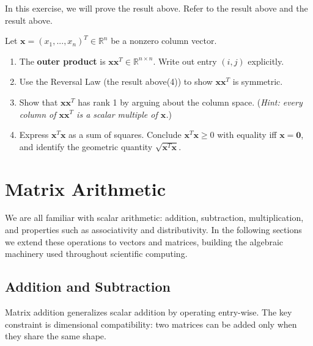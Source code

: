 \documentclass[
  letterpaper,
]{scrbook}
\newcommand{\fR}{\mathbb{R}}
\newcommand{\bx}{\boldsymbol{x}}
\newcommand{\bzero}{\mathbf{0}}
\begin{document}
\begin{tcolorbox}[enhanced jigsaw, arc=.35mm, bottomrule=.15mm, bottomtitle=1mm, breakable, colback=white, colbacktitle=quarto-callout-warning-color!10!white, colframe=quarto-callout-warning-color-frame, coltitle=black, left=2mm, leftrule=.75mm, opacityback=0, opacitybacktitle=0.6, rightrule=.15mm, title={Exercise}, titlerule=0mm, toprule=.15mm, toptitle=1mm]

In this exercise, we will prove the result above. Refer to the result
above and the result above.

Let \(\bx = (x_1, ..., x_n)^T \in \fR^n\) be a nonzero column vector.

\begin{enumerate}
\def\labelenumi{\arabic{enumi}.}
\item
  The \textbf{outer product} is \(\bx\bx^T \in \fR^{n \times n}\). Write
  out entry \((i,j)\) explicitly.
\item
  Use the Reversal Law (the result above(4)) to show \(\bx\bx^T\) is
  symmetric.
\item
  Show that \(\bx\bx^T\) has rank 1 by arguing about the column space.
  (\emph{Hint: every column of \(\bx\bx^T\) is a scalar multiple of
  \(\bx\).})
\item
  Express \(\bx^T\bx\) as a sum of squares. Conclude \(\bx^T\bx \ge 0\)
  with equality iff \(\bx = \bzero\), and identify the geometric
  quantity \(\sqrt{\bx^T\bx}\).
\end{enumerate}

\end{tcolorbox}

\chapter{Matrix Arithmetic}\label{matrix-arithmetic}

We are all familiar with scalar arithmetic: addition, subtraction,
multiplication, and properties such as associativity and distributivity.
In the following sections we extend these operations to vectors and
matrices, building the algebraic machinery used throughout scientific
computing.

\section{Addition and Subtraction}\label{addition-and-subtraction}

Matrix addition generalizes scalar addition by operating entry-wise. The
key constraint is dimensional compatibility: two matrices can be added
only when they share the same shape.
\end{document}
